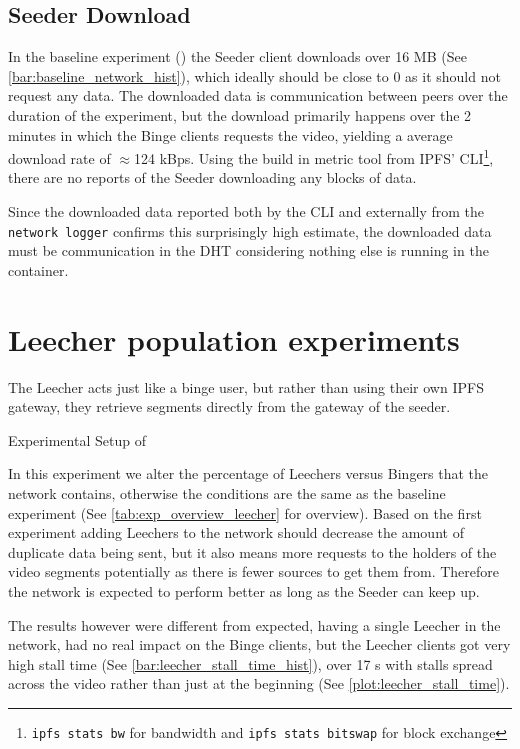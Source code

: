 \subsection{Seeder Download}
\label{sec:eval_seeder_rx}
In the baseline experiment () the Seeder client downloads over 16 \ac{MB} (See \autoref{bar:baseline_network_hist}), which ideally should be close to 0 as it should not request any data. The downloaded data is communication between peers over the duration of the experiment, but the download primarily happens over the 2 minutes in which the Binge clients requests the video, yielding a average download rate of $\approx$124 \ac{kBps}. Using the build in metric tool from \ac{IPFS}' \ac{CLI}\footnote{\texttt{ipfs stats bw} for bandwidth and \texttt{ipfs stats bitswap} for block exchange}, there are no reports of the Seeder downloading any blocks of data.

Since the downloaded data reported both by the \ac{CLI} and externally from the \texttt{network logger} confirms this surprisingly high estimate, the downloaded data must be communication in the \acs{DHT} considering nothing else is running in the container.


\FloatBarrier \section{Leecher population experiments}
\label{sec:eval_leecher}
The Leecher acts just like a binge user, but rather than using their own \ac{IPFS} gateway, they retrieve segments directly from the gateway of the seeder.

\begin{table}[!htbp]
\myfloatalign
\caption[Experimental Setup of Leecher]{Experimental Setup of }
\label{tab:exp_overview_leecher}

\end{table}

In this experiment we alter the percentage of Leechers versus Bingers that the network contains, otherwise the conditions are the same as the baseline experiment (See \autoref{tab:exp_overview_leecher} for overview).
Based on the first experiment adding Leechers to the network should decrease the amount of duplicate data being sent, but it also means more requests to the holders of the video segments potentially as there is fewer sources to get them from. Therefore the network is expected to perform better as long as the Seeder can keep up.

The results however were different from expected, having a single Leecher in the network, had no real impact on the Binge clients, but the Leecher clients got very high stall time (See \autoref{bar:leecher_stall_time_hist}), over 17 \ac{s} with stalls spread across the video rather than just at the beginning (See \autoref{plot:leecher_stall_time}). 

